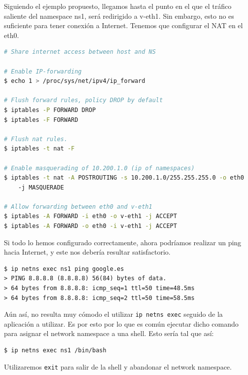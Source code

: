 \documentclass[12pt]{article}
\begin{document}
	
	\pagebreak

	\par \noindent Siguiendo el ejemplo propuesto, llegamos hasta el punto en el que el tráfico saliente del namespace ns1, será redirigido a v-eth1. Sin embargo, esto no es suficiente para tener conexión a Internet. Tenemos que configurar el NAT en el eth0.
	
	\begin{lstlisting}[language=bash, caption=Configuración de NAT para dar Internet a un network namespace]
# Share internet access between host and NS

# Enable IP-forwarding
$ echo 1 > /proc/sys/net/ipv4/ip_forward

# Flush forward rules, policy DROP by default
$ iptables -P FORWARD DROP
$ iptables -F FORWARD

# Flush nat rules.
$ iptables -t nat -F

# Enable masquerading of 10.200.1.0 (ip of namespaces)
$ iptables -t nat -A POSTROUTING -s 10.200.1.0/255.255.255.0 -o eth0 
	-j MASQUERADE

# Allow forwarding between eth0 and v-eth1
$ iptables -A FORWARD -i eth0 -o v-eth1 -j ACCEPT
$ iptables -A FORWARD -o eth0 -i v-eth1 -j ACCEPT
	\end{lstlisting}
	
	\addvspace{10px}
	
	\par \noindent Si todo lo hemos configurado correctamente, ahora podríamos realizar un ping hacia Internet, y este nos debería resultar satisfactorio.
	\begin{verbatim}
$ ip netns exec ns1 ping google.es
> PING 8.8.8.8 (8.8.8.8) 56(84) bytes of data.
> 64 bytes from 8.8.8.8: icmp_seq=1 ttl=50 time=48.5ms
> 64 bytes from 8.8.8.8: icmp_seq=2 ttl=50 time=58.5ms
	\end{verbatim}

	\addvspace{10px}
	
	\par \noindent Aún así, no resulta muy cómodo el utilizar \texttt{ip netns exec} seguido de la aplicación a utilizar. Es por esto por lo que es común ejecutar dicho comando para asignar el network namespace a una shell. Esto sería tal que así:
	\begin{verbatim}
$ ip netns exec ns1 /bin/bash
	\end{verbatim}
	\par \noindent Utilizaremos \texttt{exit} para salir de la shell y abandonar el network namespace.
\end{document}
